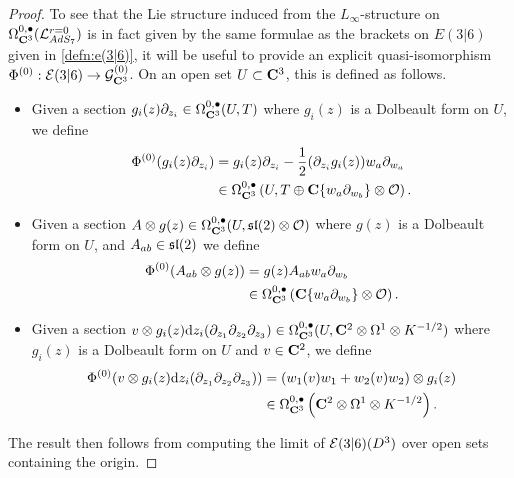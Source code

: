 \documentclass[../main.tex]{subfiles}
\begin{document}
\begin{proof}
To see that the Lie structure induced from the $L_\infty$-structure on $\Omega^{0,\bullet}_{\mathbf{C}^3} (\mathcal{L}^{r=0}_{AdS_7} )$ is in fact given by the same formulae as the brackets on $E(3|6)$ given in \ref{defn:e(3|6)}, it will be useful to provide an explicit quasi-isomorphism $\Phi^{(0)} : \mathcal{E}(3|6) \to \mathcal{G}^{(0)}_{\mathbf{C}^3}$. On an open set $U\subset \mathbf{C}^3$, this is defined as follows.

\begin{itemize}
\item Given a section $g_i(z)\partial_{z_i}\in \Omega^{0,\bullet}_{\mathbf{C}^3} (U, T)$ where $g_i(z)$ is a Dolbeault form on $U$, we define
\begin{align*}
\Phi^{(0)} (g_i (z) \partial_{z_i} ) &= g_i (z) \partial_{z_i} - \frac 12(\partial_{z_i} g_i (z)) w_a \partial_{w_a} \\
&\in \Omega^{0,\bullet}_{\mathbf{C}^3} \left ( U, T \oplus \mathbf{C} \{w_a \partial_{w_b} \} \otimes \mathcal{O} \right ).  
\end{align*}

\item Given a section $A\otimes g(z)\in \Omega^{0,\bullet}_{\mathbf{C}^3} (U,\mathfrak{sl}(2) \otimes \mathcal{O})$ where $g(z)$ is a Dolbeault form on $U$, and $A_{ab}\in \mathfrak{sl}(2)$ we define
\begin{align*}
\Phi^{(0)} (A_{ab}\otimes g(z) ) &=  g(z) A_{ab}w_a\partial_{w_b}\\
&\in \Omega^{0,\bullet}_{\mathbf{C}^3} \left ( \mathbf{C} \{w_a \partial_{w_b} \} \otimes \mathcal{O} \right ).  
\end{align*}

\item Given a section $v\otimes g_i(z)\mathrm{d} z_i (\partial_{z_1}\partial_{z_2}\partial_{z_3} ) \in \Omega^{0,\bullet}_{\mathbf{C}^3} (U, \mathbf{C}^2\otimes \Omega^1\otimes K^{-1/2})$ where $g_i(z)$ is a Dolbeault form on $U$ and $v\in \mathbf{C}^2$, we define
\begin{align*}
\Phi^{(0)} (v\otimes g_i(z)\mathrm{d} z_i (\partial_{z_1}\partial_{z_2}\partial_{z_3} ) ) &= (w_1(v)w_1+w_2(v)w_2) \otimes g_i(z)  \\
&\in \Omega^{0,\bullet}_{\mathbf{C}^3} \left ( \mathbf{C}^2\otimes \Omega^1\otimes K^{-1/2}  \right ).  
\end{align*}
\end{itemize}

The result then follows from computing the limit of $\mathcal{E}(3|6) (D^3)$ over open sets containing the origin.
\end{proof}
%
\end{document}
